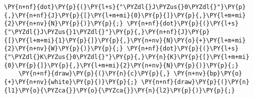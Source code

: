 \begin{Verbatim}[commandchars=\\\{\}]
    \PY{n+nf}{dot}\PY{p}{(}\PY{l+s}{"\PYZdl{}J\PYZus{}0\PYZdl{}"}\PY{p}{,}\PY{n+nf}{J}\PY{p}{[}\PY{l+m+mi}{0}\PY{p}{]}\PY{p}{,}\PY{l+m+mi}{2}\PY{n+nv}{N}\PY{p}{)}\PY{p}{;} \PY{n+nf}{dot}\PY{p}{(}\PY{l+s}{"\PYZdl{}J\PYZus{}1\PYZdl{}"}\PY{p}{,}\PY{n+nf}{J}\PY{p}{[}\PY{l+m+mi}{1}\PY{p}{]}\PY{p}{,}\PY{n+nv}{N}\PY{o}{+}\PY{l+m+mi}{2}\PY{n+nv}{W}\PY{p}{)}\PY{p}{;} \PY{n+nf}{dot}\PY{p}{(}\PY{l+s}{"\PYZdl{}K\PYZus{}0\PYZdl{}"}\PY{p}{,}\PY{n}{K}\PY{p}{[}\PY{l+m+mi}{0}\PY{p}{]}\PY{p}{,}\PY{l+m+mi}{2}\PY{n+nv}{N}\PY{p}{)}\PY{p}{;}
    \PY{n+nf}{draw}\PY{p}{(}\PY{n}{c}\PY{p}{,} \PY{n+nv}{bp}\PY{o}{+}\PY{n+nv}{white}\PY{p}{)}\PY{p}{;} \PY{n+nf}{draw}\PY{p}{(}\PY{n}{l1}\PY{o}{\PYZca{}}\PY{o}{\PYZca{}}\PY{n}{l2}\PY{p}{)}\PY{p}{;}
\end{Verbatim}
